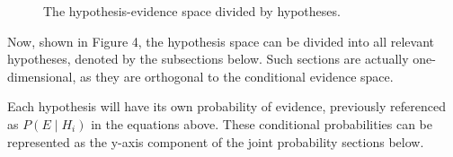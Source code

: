\documentclass[12pt]{article}
\begin{document}
\begin{figure}[h!]
\begin{minipage}{0.50\textwidth}
    \end{minipage}
    \caption{The hypothesis-evidence space divided by hypotheses.}
    \label{fig:both_visuals_3_4}
\end{figure}


\noindent Now, shown in Figure 4, the hypothesis space can be divided into all relevant hypotheses, denoted by the subsections below. Such sections are actually one-dimensional, as they are orthogonal to the conditional evidence space. \\

\newpage

\noindent Each hypothesis will have its own probability of evidence, previously referenced as $P(E \mid H_i)$ in the equations above. These conditional probabilities can be represented as the y-axis component of the joint probability sections below.
\end{document}
